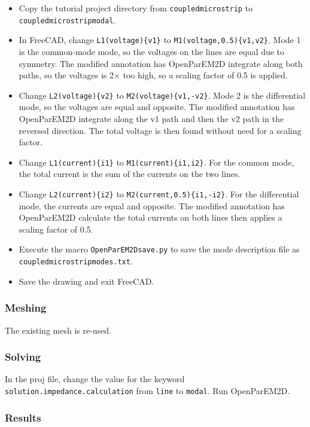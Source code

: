 \documentclass[titlepage]{article}
\renewcommand\_{\textunderscore\linebreak[1]}
\begin{document}
\begin{itemize}
\item Copy the tutorial project directory from \texttt{coupled\_microstrip} to \texttt{coupled\_microstrip\_modal}.
\item In FreeCAD, change \texttt{\_L1(voltage)\{v1\}} to \texttt{\_M1(voltage,0.5)\{v1,v2\}}.  Mode 1 is the common-mode mode, so the voltages on the lines are equal due to symmetry.  The modified annotation has OpenParEM2D integrate along both paths, so the voltages is 2$\times$ too high, so a scaling factor of 0.5 is applied.
\item Change \texttt{\_L2(voltage)\{v2\}} to \texttt{\_M2(voltage)\{v1,-v2\}}.  Mode 2 is the differential mode, so the voltages are equal and opposite.  The modified annotation has OpenParEM2D integrate along the v1 path and then the v2 path in the reversed direction.  The total voltage is then found without need for a scaling factor.
\item Change \texttt{\_L1(current)\{i1\}} to \texttt{\_M1(current)\{i1,i2\}}.  For the common mode, the total current is the sum of the currents on the two lines.
\item Change \texttt{\_L2(current)\{i2\}} to \texttt{\_M2(current,0.5)\{i1,-i2\}}.  For the differential mode, the currents are equal and opposite.  The modified annotation has OpenParEM2D calculate the total currents on both lines then applies a scaling factor of 0.5.
\item Execute the macro \texttt{OpenParEM2D\_save.py} to save the mode description file as \texttt{coupled\_microstrip\_modes.txt}.
\item Save the drawing and exit FreeCAD.
\end{itemize}

\subsubsection{Meshing}

The existing mesh is re-used.

\subsubsection{Solving}

In the proj file, change the value for the keyword \texttt{solution.impedance.calculation} from \texttt{line} to \texttt{modal}.  Run OpenParEM2D.

\subsubsection{Results}
\end{document}
